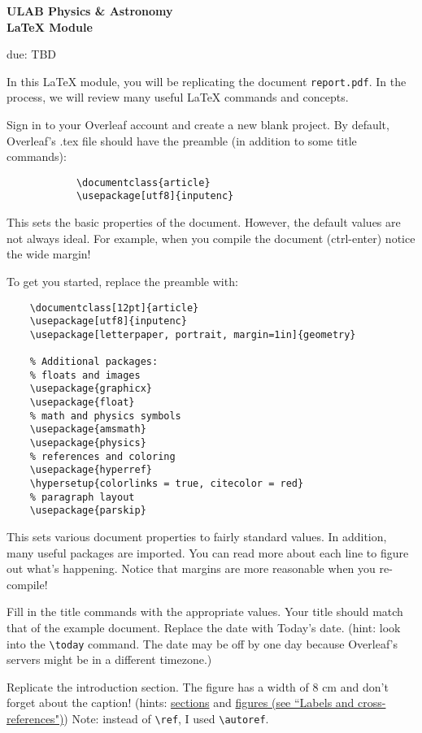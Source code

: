 \documentclass[addpoints,12pt]{exam}
\numberwithin{equation}{section}
\begin{document}
	
	\begin{center}
		\textbf{\Large{ULAB Physics \& Astronomy\\LaTeX Module}}
	\end{center}
	\begin{center}
		due: TBD
	\end{center}
	
	In this LaTeX module, you will be replicating the document \verb|report.pdf|. In the process, we will review many useful LaTeX commands and concepts.
	
	\begin{questions}
		
		\question[10] Sign in to your Overleaf account and create a new blank project. By default, Overleaf's .tex file should have the preamble (in addition to some title commands):
		\begin{verbatim}
		    \documentclass{article}
		    \usepackage[utf8]{inputenc}
		\end{verbatim}
		This sets the basic properties of the document. However, the default values are not always ideal. For example, when you compile the document (ctrl-enter) notice the wide margin!
		
		To get you started, replace the preamble with:
		\begin{verbatim}
    \documentclass[12pt]{article}
    \usepackage[utf8]{inputenc}
    \usepackage[letterpaper, portrait, margin=1in]{geometry}
    
    % Additional packages:
    % floats and images
    \usepackage{graphicx}
    \usepackage{float}
    % math and physics symbols
    \usepackage{amsmath}
    \usepackage{physics}
    % references and coloring
    \usepackage{hyperref}
    \hypersetup{colorlinks = true, citecolor = red}
    % paragraph layout
    \usepackage{parskip}		
\end{verbatim}

    This sets various document properties to fairly standard values. In addition, many useful packages are imported. You can read more about each line to figure out what's happening. Notice that margins are more reasonable when you re-compile!
		
	\question[10] Fill in the title commands with the appropriate values. Your title should match that of the example document. Replace the date with Today's date. (hint: look into the \verb|\today| command. The date may be off by one day because Overleaf's servers might be in a different timezone.)
	
	\question[20] Replicate the introduction section. The figure has a width of 8 cm and don't forget about the caption! (hints: \href{https://www.overleaf.com/learn/latex/Sections_and_chapters}{sections} and \href{https://www.overleaf.com/learn/latex/Inserting_Images}{figures (see ``Labels and cross-references")}) Note: instead of \verb|\ref|, I used \verb|\autoref|.
	

\end{questions}
\end{document}
